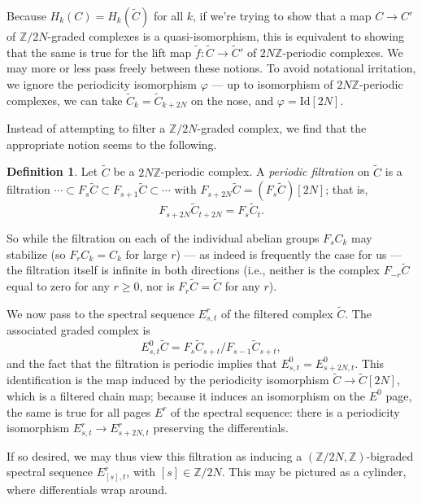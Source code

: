 \documentclass{memo-l}
\theoremstyle{definition}
\newtheorem{definition}[theorem]{Definition}
\theoremstyle{remark}
\numberwithin{section}{chapter}
\numberwithin{equation}{chapter}
\begin{document}
Because $H_k(C) = H_k(\widetilde C)$ for all $k$, if we're trying to show that a map $C \to C'$ of $\mathbb Z/2N$-graded complexes is a quasi-isomorphism, this is equivalent to showing that the same is true for the lift map $\tilde f: \widetilde C \to \widetilde C'$ of $2N\mathbb Z$-periodic complexes. We may more or less pass freely between these notions. To avoid notational irritation, we ignore the periodicity isomorphism $\varphi$ --- up to isomorphism of $2N\mathbb Z$-periodic complexes, we can take $\widetilde C_k = \widetilde C_{k+2N}$ on the nose, and $\varphi = \text{Id}[2N]$.

Instead of attempting to filter a $\mathbb Z/2N$-graded complex, we find that the appropriate notion seems to the following.

\begin{definition}\label{pfilt}Let $\widetilde C$ be a $2N\mathbb Z$-periodic complex. A \emph{periodic filtration} on $\widetilde C$ is a filtration $\cdots \subset F_s \widetilde C \subset F_{s+1} \widetilde C \subset \cdots$ with $F_{s+2N}\widetilde C = (F_s \widetilde C)[2N]$; that is, $$F_{s+2N} \widetilde C_{t+2N} = F_s \widetilde C_t.$$ %
\end{definition}

So while the filtration on each of the individual abelian groups $F_s C_k$ may stabilize (so $F_r C_k = C_k$ for large $r$) --- as indeed is frequently the case for us --- the filtration itself is infinite in both directions (i.e., neither is the complex $F_{-r}\widetilde C$ equal to zero for any $r \geq 0$, nor is $F_r \widetilde C = \widetilde C$ for any $r$).

We now pass to the spectral sequence $E^r_{s,t}$ of the filtered complex $\widetilde C$. The associated graded complex is $$E^0_{s,t}\widetilde C = F_s \widetilde C_{s+t}/F_{s-1} \widetilde C_{s+t},$$ and the fact that the filtration is periodic implies that $E^0_{s,t} = E^0_{s+2N,t}$. This identification is the map induced by the periodicity isomorphism $\widetilde C \to \widetilde C[2N]$, which is a filtered chain map; because it induces an isomorphism on the $E^0$ page, the same is true for all pages $E^r$ of the spectral sequence: there is a periodicity isomorphism $E^r_{s,t} \to E^r_{s+2N,t}$ preserving the differentials.

If so desired, we may thus view this filtration as inducing a $(\mathbb Z/2N,\mathbb Z)$-bigraded spectral sequence $E^r_{[s],t}$, with $[s] \in \mathbb Z/2N$. This may be pictured as a cylinder, where differentials wrap around.
\end{document}
